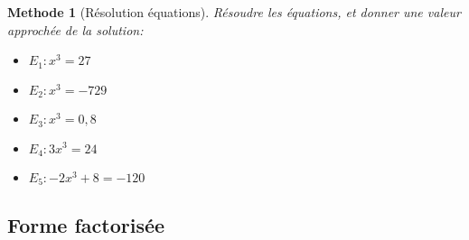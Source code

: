\documentclass[11pt,a4paper]{article}
\theoremstyle{break}
\newtheorem{Meth}{Methode}
\begin{document}
	\begin{Meth}[Résolution équations]
		Résoudre les équations, et donner une valeur approchée de la solution: 
		\begin{multicols}{3}
			\begin{itemize}
			\item 	$E_1: x^3=27$
			\item $E_2: x^3=-729$ 
			\item 	$E_3: x^3=0,8$
			\item $E_4: 3x^3=24$
			\item $E_5: -2x^3+8=-120$
		\end{itemize}
		\end{multicols}

		\end{Meth}
	\subsection{Forme factorisée}
\end{document}
